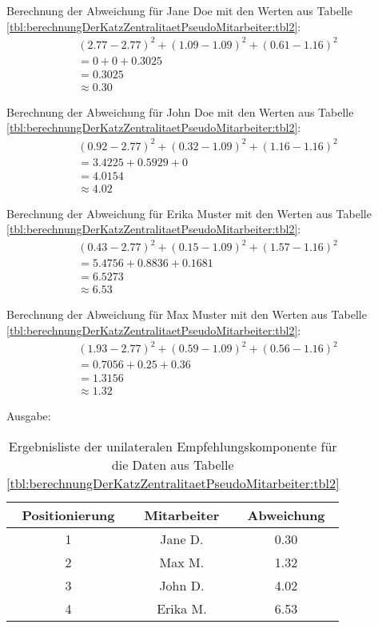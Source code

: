 Berechnung der Abweichung für Jane Doe mit den Werten aus Tabelle \ref{tbl:berechnungDerKatzZentralitaetPseudoMitarbeiter:tbl2}:
\begin{gather}
	\nonumber (2.77-2.77)^2 + (1.09-1.09)^2 + (0.61-1.16)^2\\
	\nonumber = 0 + 0 + 0.3025\\
	\nonumber = 0.3025\\
	\approx 0.30
	\label{frml:nebenrechnungen:unilateral:jane}
\end{gather}

Berechnung der Abweichung für John Doe mit den Werten aus Tabelle \ref{tbl:berechnungDerKatzZentralitaetPseudoMitarbeiter:tbl2}:
\begin{gather}
	\nonumber (0.92-2.77)^2 + (0.32-1.09)^2 + (1.16-1.16)^2\\
	\nonumber = 3.4225 + 0.5929 + 0\\
	\nonumber = 4.0154\\
	\approx 4.02
	\label{frml:nebenrechnungen:unilateral:john}
\end{gather}

Berechnung der Abweichung für Erika Muster mit den Werten aus Tabelle \ref{tbl:berechnungDerKatzZentralitaetPseudoMitarbeiter:tbl2}:
\begin{gather}
	\nonumber (0.43-2.77)^2 + (0.15-1.09)^2 + (1.57-1.16)^2\\
	\nonumber = 5.4756 + 0.8836 + 0.1681\\
	\nonumber = 6.5273\\
	\approx 6.53
	\label{frml:nebenrechnungen:unilateral:erika}
\end{gather}

Berechnung der Abweichung für Max Muster mit den Werten aus Tabelle \ref{tbl:berechnungDerKatzZentralitaetPseudoMitarbeiter:tbl2}:
\begin{gather}
	\nonumber (1.93-2.77)^2 + (0.59-1.09)^2 + (0.56-1.16)^2\\
	\nonumber = 0.7056 + 0.25 + 0.36\\
	\nonumber = 1.3156\\
	\approx 1.32
	\label{frml:nebenrechnungen:unilateral:max}
\end{gather}

Ausgabe:
\begin{table}[h]
	\centering
	\begin{tabular}{c|c|c}
		Positionierung & Mitarbeiter & Abweichung\\
		\hline
		1 & Jane D.  & 0.30\\
		2 & Max M.   & 1.32\\
		3 & John D.  & 4.02\\
		4 & Erika M. & 6.53
	\end{tabular}
	\caption{Ergebnisliste der unilateralen Empfehlungskomponente für die Daten aus Tabelle \ref{tbl:berechnungDerKatzZentralitaetPseudoMitarbeiter:tbl2}}
	\label{tbl:nebenrechnungen:unilateral:ausgabe}
\end{table}